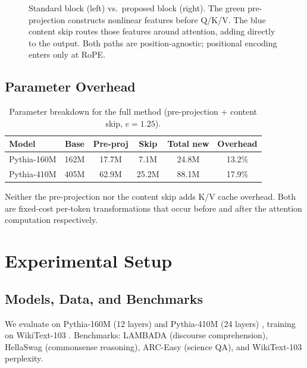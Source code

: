 \documentclass[11pt]{article}
\begin{document}
\begin{figure}[t]
\caption{Standard block (left) vs.\ proposed block (right). The green pre-projection constructs nonlinear features before Q/K/V. The blue content skip routes those features around attention, adding directly to the output. Both paths are position-agnostic; positional encoding enters only at RoPE.}
\label{fig:architecture}
\end{figure}

\subsection{Parameter Overhead}

\begin{table}[h]
\centering
\caption{Parameter breakdown for the full method (pre-projection + content skip, $e = 1.25$).}
\label{tab:overhead}
\begin{tabular}{lccccc}
\toprule
\textbf{Model} & \textbf{Base} & \textbf{Pre-proj} & \textbf{Skip} & \textbf{Total new} & \textbf{Overhead} \\
\midrule
Pythia-160M & 162M & 17.7M & 7.1M & 24.8M & 13.2\% \\
Pythia-410M & 405M & 62.9M & 25.2M & 88.1M & 17.9\% \\
\bottomrule
\end{tabular}
\end{table}

Neither the pre-projection nor the content skip adds K/V cache overhead. Both are fixed-cost per-token transformations that occur before and after the attention computation respectively.

\section{Experimental Setup}

\subsection{Models, Data, and Benchmarks}

We evaluate on Pythia-160M (12 layers) and Pythia-410M (24 layers) \citep{biderman2023pythia}, training on WikiText-103 \citep{merity2016pointer}. Benchmarks: LAMBADA \citep{paperno2016lambada} (discourse comprehension), HellaSwag \citep{zellers2019hellaswag} (commonsense reasoning), ARC-Easy \citep{clark2018arc} (science QA), and WikiText-103 perplexity.
\end{document}

